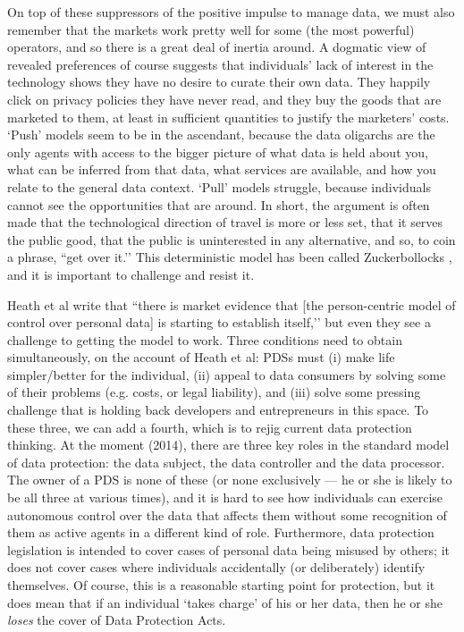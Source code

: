 \documentclass[graybox]{svmult}
\begin{document}
On top of these suppressors of the positive impulse to manage data, we must also remember that the markets work pretty well for some (the most powerful) operators, and so there is a great deal of inertia around. A dogmatic view of revealed preferences of course suggests that individuals’ lack of interest in the technology shows they have no desire to curate their own data. They happily click on privacy policies they have never read, and they buy the goods that are marketed to them, at least in sufficient quantities to justify the marketers’ costs. `Push’ models seem to be in the ascendant, because the data oligarchs are the only agents with access to the bigger picture of what data is held about you, what can be inferred from that data, what services are available, and how you relate to the general data context. `Pull’ models struggle, because individuals cannot see the opportunities that are around. In short, the argument is often made that the technological direction of travel is more or less set, that it serves the public good, that the public is uninterested in any alternative, and so, to coin a phrase, ``get over it.’’ This deterministic model has been called Zuckerbollocks \cite{}, and it is important to challenge and resist it.


Heath et al write \cite{} that ``there is market evidence that [the person-centric model of control over personal data] is starting to establish itself,’’ but even they see a challenge to getting the model to work. Three conditions need to obtain simultaneously, on the account of Heath et al: PDSs must (i) make life simpler/better for the individual, (ii) appeal to data consumers by solving some of their problems (e.g. costs, or legal liability), and (iii) solve some pressing challenge that is holding back developers and entrepreneurs in this space. To these three, we can add a fourth, which is to rejig current data protection thinking. At the moment (2014), there are three key roles in the standard model of data protection: the data subject, the data controller and the data processor. The owner of a PDS is none of these (or none exclusively --- he or she is likely to be all three at various times), and it is hard to see how individuals can exercise autonomous control over the data that affects them without some recognition of them as active agents in a different kind of role. Furthermore, data protection legislation is intended to cover cases of personal data being misused by others; it does not cover cases where individuals accidentally (or deliberately) identify themselves. Of course, this is a reasonable starting point for protection, but it does mean that if an individual `takes charge’ of his or her data, then he or she {\em loses} the cover of Data Protection Acts.
\end{document}
